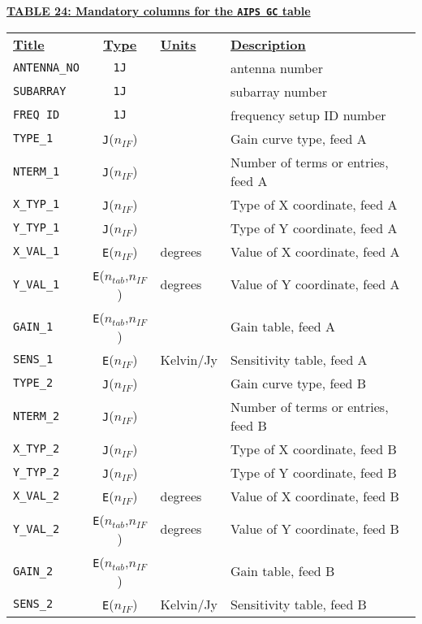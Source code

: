 \documentclass[twoside]{article}
\newcommand{\nif}{$n_{IF}$}
\newcommand{\ntab}{$n_{tab}$}
\begin{document}
\begin{center}
\underline{\bf{TABLE 24: Mandatory columns for the {\tt AIPS GC} table}}\\
\begin{tabular}{lcll}
\noalign{\vspace{2pt}} \label{ta:GCcols}
\underline{{\bf Title\vphantom{y}}} & \underline{\bf{Type}} &
   \underline{{\bf Units\vphantom{y}}} & \underline{\bf{Description}} \\
\noalign{\vspace{2pt}}
{\tt ANTENNA\_NO} & {\tt 1J} & & antenna number \\
{\tt SUBARRAY}    & {\tt 1J} & & subarray number \\
{\tt FREQ ID}     & {\tt 1J} & & frequency setup ID number \\
{\tt TYPE\_1}     & {\tt J}(\nif) &  & Gain curve type, feed A \\
{\tt NTERM\_1}    & {\tt J}(\nif) &  & Number of terms or entries, feed A \\
{\tt X\_TYP\_1}   & {\tt J}(\nif) &  & Type of X coordinate, feed A \\
{\tt Y\_TYP\_1}   & {\tt J}(\nif) &  & Type of Y coordinate, feed A \\
{\tt X\_VAL\_1}   & {\tt E}(\nif) & degrees & Value of X coordinate, feed A \\
{\tt Y\_VAL\_1}   & {\tt E}(\ntab,\nif) & degrees & Value of Y coordinate, feed A \\
{\tt GAIN\_1}     & {\tt E}(\ntab,\nif) &  & Gain table, feed A \\
{\tt SENS\_1}     & {\tt E}(\nif) & Kelvin/Jy & Sensitivity table, feed A \\
\hline
{\tt TYPE\_2}     & {\tt J}(\nif) &  & Gain curve type, feed B \\
{\tt NTERM\_2}    & {\tt J}(\nif) &  & Number of terms or entries, feed B \\
{\tt X\_TYP\_2}   & {\tt J}(\nif) &  & Type of X coordinate, feed B \\
{\tt Y\_TYP\_2}   & {\tt J}(\nif) &  & Type of Y coordinate, feed B \\
{\tt X\_VAL\_2}   & {\tt E}(\nif) & degrees & Value of X coordinate, feed B \\
{\tt Y\_VAL\_2}   & {\tt E}(\ntab,\nif) & degrees & Value of Y coordinate, feed B \\
{\tt GAIN\_2}     & {\tt E}(\ntab,\nif) &  & Gain table, feed B \\
{\tt SENS\_2}     & {\tt E}(\nif) & Kelvin/Jy & Sensitivity table, feed B
\end{tabular}
\end{center}
\end{document}

